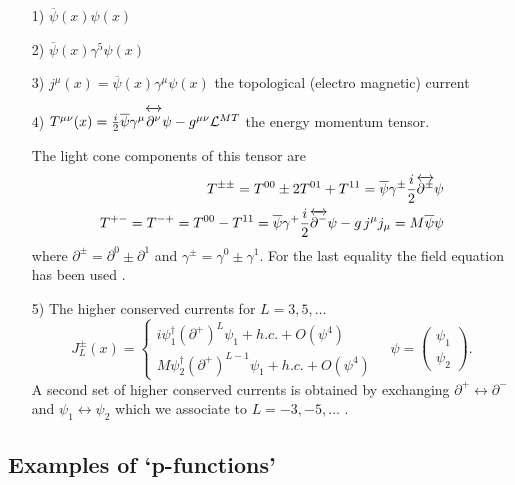 \documentclass[a4paper,a4paper]{article}
\begin{document}
\begin{itemize}
\item[1)]  $\overline{\psi }(x)\psi (x)$

\item[2)]  $\overline{\psi }(x)\gamma ^{5}\psi (x)$

\item[3)]  $j^{\mu }(x)=\overline{\psi }(x)\gamma ^{\mu }\psi (x)$ the
topological (electro magnetic) current

\item[4)]  $T^{\mu \nu }(x)=\tfrac{i}{2}\overline{\psi }\gamma ^{\mu }%
\overleftrightarrow{\partial ^{\nu }\rule{0in}{0.14in}}\psi -g^{\mu \nu }%
\mathcal{L}^{MT}$ the energy momentum tensor.

The light cone components of this tensor are 
\begin{eqnarray*}
T^{\pm \pm }=T^{00}\pm 2T^{01}+T^{11}=\overline{\psi }\gamma ^{\pm }\frac{i}{%
2}\overleftrightarrow{\partial ^{\pm }}\psi \\
T^{+-}=T^{-+}=T^{00}-T^{11}=\overline{\psi }\gamma ^{+}\frac{i}{2}%
\overleftrightarrow{\partial ^{-}}\psi -g\,j^{\mu }j_{\mu }=M\overline{\psi }%
\psi
\end{eqnarray*}
where $\partial ^{\pm }=\partial ^{0}\pm \partial ^{1}$ and $\gamma ^{\pm
}=\gamma ^{0}\pm \gamma ^{1}$. For the last equality the field equation has
been used .

\item[5)]  The higher conserved currents \cite{BKT,KN} for $L=3,5,\dots $%
\[
J_{L}^{\pm }(x)=\left\{ 
\begin{array}{l}
i\psi _{1}^{\dagger }\left( \partial ^{+}\right) ^{L}\psi _{1}+h.c.+O(\psi
^{4}) \\ 
M\psi _{2}^{\dagger }\left( \partial ^{+}\right) ^{L-1}\psi _{1}+h.c.+O(\psi
^{4})
\end{array}
\right. \quad \psi =\left( 
\begin{array}{l}
\psi _{1} \\ 
\psi _{2}
\end{array}
\right) . 
\]
A second set of higher conserved currents is obtained by exchanging $%
\partial ^{+}\leftrightarrow \partial ^{-}$ and $\psi _{1}\leftrightarrow
\psi _{2}$ which we associate to $L=-3,-5,\dots $ .
\end{itemize}

\subsection{Examples of `p-functions'}
\end{document}
